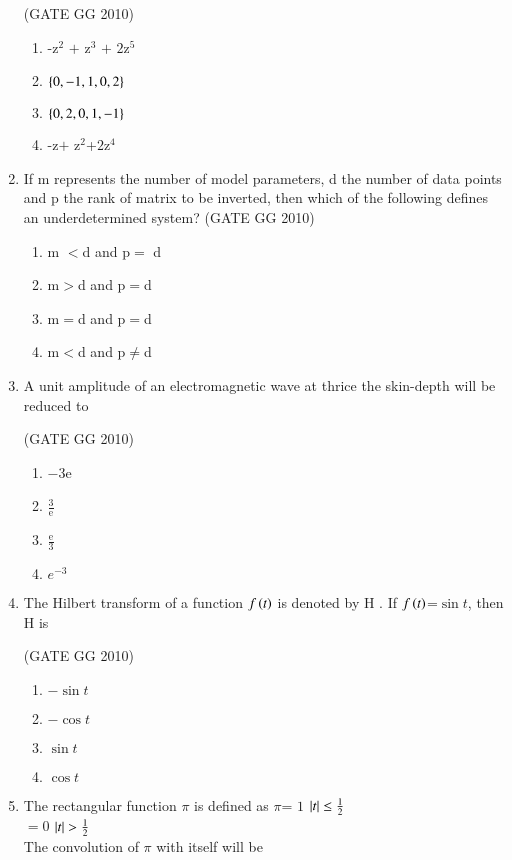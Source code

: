 \documentclass[journal]{IEEEtran}
\begin{document}
\begin{enumerate}[start=26]
\hfill{(GATE GG 2010)}

\begin{enumerate}

    \item -z$^2$ $+$ z$^3$ $+$ $2$z$^5$
    \item $\left\{0,-1,1,0,2\right\}$
    \item $\left\{0,2,0,1,-1\right\}$
    \item -z$+$ z$^2$+$2$z$^4$
\end{enumerate}
\item If m represents the number of model parameters, d the number of data points and p the rank of matrix to be inverted, then which of the following defines an underdetermined system?
\hfill{(GATE GG 2010)}
\begin{enumerate}
    \item  m $<$d and p$=$ d
\item  m$>$d and p$=$d
\item  m$=$d and p$=$d
\item  m$<$d and p$\neq$d
\end{enumerate}

\item A unit amplitude of an electromagnetic wave at thrice the skin-depth will be reduced to

\hfill{(GATE GG 2010)}

\begin{enumerate}
    \item $-3$e
\item $\frac{3}{\text{e}}$
\item $\frac{\text{e}}{3}$
\item $e^{-3}$
\end{enumerate}

\item The Hilbert transform of a function $f\left(t\right)$ is denoted by H . If $f\left(t\right)$=$\sin{t}$, then H  is

\hfill{(GATE GG 2010)}

\begin{enumerate}
    \item $-\sin{t}$
\item $-\cos{t}$
\item $\sin{t}$
\item $\cos{t}$
\end{enumerate}

\item The rectangular function $\pi$ is defined as $\pi$= $1$ \hspace{0.7cm}   $\left\vert t\right\vert\leq \frac{1}{2}$\\
\hspace*{6.7cm} $=0$ \hspace{0.7cm} $\left\vert t\right\vert >\frac{1}{2}$\\
The convolution of $\pi$ with itself will be 


\end{enumerate}
\end{document}
